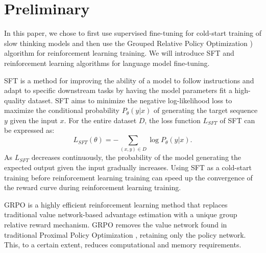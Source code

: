 \section{Preliminary}

In this paper, we chose to first use supervised fine-tuning for cold-start training of slow thinking models and then use the Grouped Relative Policy Optimization \citep[GRPO;][]{shao2024deepseekmath}) algorithm for reinforcement learning training. We will introduce SFT and reinforcement learning algorithms for language model fine-tuning.

SFT is a method for improving the ability of a model to follow instructions and adapt to specific downstream tasks by having the model parameters fit a high-quality dataset.
SFT aims to minimize the negative log-likelihood loss to maximize the conditional probability \( P_{\theta}(y|x) \) of generating the target sequence \( y \) given the input \( x \). For the entire dataset \( D \), the loss function \( L_{SFT} \) of SFT can be expressed as:
\begin{equation}
L_{SFT}(\theta) = -\sum_{(x,y) \in D} \log P_{\theta}(y|x).
\end{equation}
As \( L_{SFT} \) decreases continuously, the probability of the model generating the expected output given the input gradually increases. Using SFT as a cold-start training before reinforcement learning training can speed up the convergence of the reward curve during reinforcement learning training.

GRPO is a highly efficient reinforcement learning method that replaces traditional value network-based advantage estimation with a unique group relative reward mechanism. GRPO removes the value network found in traditional Proximal Policy Optimization \citep[PPO;][]{schulman2017proximal}, retaining only the policy network. This, to a certain extent, reduces computational and memory requirements.

